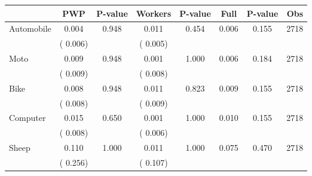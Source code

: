 
\begin{tabular}{l*{7}{c}}\hline&\multicolumn{1}{c}{PWP}&\multicolumn{1}{c}{P-value}&\multicolumn{1}{c}{Workers}&\multicolumn{1}{c}{P-value}&\multicolumn{1}{c}{Full}&\multicolumn{1}{c}{P-value}&\multicolumn{1}{c}{Obs} \\ \hline

 Automobile       &              0.004       &        0.948  &              0.011       &        0.454  &              0.006       &              0.155 &  2718 \\ 
                       &       (       0.006)             &                               &       (       0.005)                     &                               &                                               &                                &                      \\ 

 Moto       &              0.009       &        0.948  &              0.001       &        1.000  &              0.006       &              0.184 &  2718 \\ 
                       &       (       0.009)             &                               &       (       0.008)                     &                               &                                               &                                &                      \\ 

 Bike       &              0.008       &        0.948  &              0.011       &        0.823  &              0.009       &              0.155 &  2718 \\ 
                       &       (       0.008)             &                               &       (       0.009)                     &                               &                                               &                                &                      \\ 

 Computer       &              0.015       &        0.650  &              0.001       &        1.000  &              0.010       &              0.155 &  2718 \\ 
                       &       (       0.008)             &                               &       (       0.006)                     &                               &                                               &                                &                      \\ 

 Sheep       &              0.110       &        1.000  &              0.011       &        1.000  &              0.075       &              0.470 &  2718 \\ 
                       &       (       0.256)             &                               &       (       0.107)                     &                               &                                               &                                &                      \\ 


\end{tabular}
